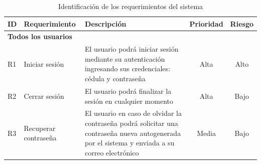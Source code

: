 \begin{footnotesize}
\begin{spacing}{1}

    \begin{center}
        \renewcommand*{\arraystretch}{1.4}
        \begin{longtable}[l]{|p{}|p{}|p{}|p{}| p{}|}
            \caption{Identificación de los requerimientos del sistema}\label{tab:table_requerimientos_sistema} \\
            \hline
            \textbf{ID} & \textbf{Requerimiento}                            & \textbf{Descripción}                                                                                                                                                                                                                                                                                                                                                                                                                                                                   & \textbf{Prioridad}         & \textbf{Riesgo}           \\
            \hline
            \multicolumn{5}{|l|}{ \textbf{Todos los usuarios} } \\
            \hline
            R1          & Iniciar sesión                                    & El usuario podrá iniciar sesión mediante su autenticación ingresando sus credenciales: cédula y contraseña & \multicolumn{1}{c|}{Alta} & \multicolumn{1}{c|}{Alto}\\
            \hline
            R2          & Cerrar sesión                                     & El usuario podrá finalizar la sesión en cualquier momento                                                                                                                                                                                                                                                                                                                                                                                                                              & \multicolumn{1}{c|}{Alta} & \multicolumn{1}{c|}{Bajo}\\
            \hline
            R3          & Recuperar contraseña                              & El usuario en caso de olvidar la contraseña podrá solicitar una contraseña nueva autogenerada por el sistema y enviada a su correo electrónico & \multicolumn{1}{c|}{Media} & \multicolumn{1}{c|}{Bajo}\\

\end{longtable}
\end{center}
\end{spacing}
\end{footnotesize}
